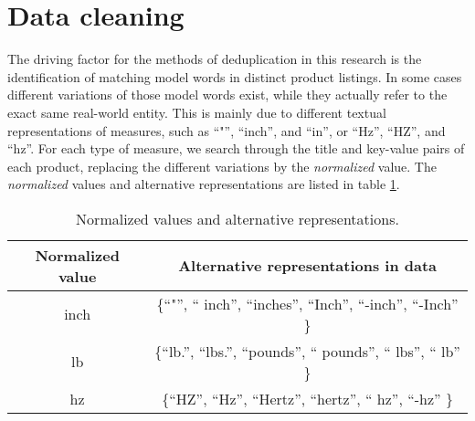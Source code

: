 \section{Data cleaning}
\label{section:data:data_cleaning}
The driving factor for the methods of deduplication in this research is the identification of matching model words in distinct product listings. In some cases different variations of those model words exist, while they actually refer to the exact same real-world entity. This is mainly due to different textual representations of measures, such as ``"'', ``inch'', and ``in'', or ``Hz'', ``HZ'', and ``hz''. For each type of measure, we search through the title and key-value pairs of each product, replacing the different variations by the \textit{normalized} value. The \textit{normalized} values and alternative representations are listed in table \ref{table:data_cleaning}.
\begin{table}
    \centering
    \caption{Normalized values and alternative representations.}
    \begin{tabular}{ |c|c| } 
     \hline
     Normalized value & Alternative representations in data\\ 
     \hline
     inch & \{``"'', `` inch'', ``inches'', ``Inch'', ``-inch'', ``-Inch'' \} \\
     \hline
     lb & \{``lb.'', ``lbs.'', ``pounds'', `` pounds'', `` lbs'', `` lb'' \} \\ 
     \hline
     hz & \{``HZ'', ``Hz'', ``Hertz'', ``hertz'', `` hz'', ``-hz'' \} \\ 
     \hline
    \end{tabular}
    
    \label{table:data_cleaning}
\end{table}

